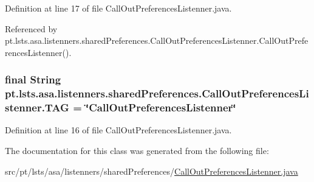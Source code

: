 Definition at line 17 of file Call\+Out\+Preferences\+Listenner.\+java.



Referenced by pt.\+lsts.\+asa.\+listenners.\+shared\+Preferences.\+Call\+Out\+Preferences\+Listenner.\+Call\+Out\+Preferences\+Listenner().

\hypertarget{classpt_1_1lsts_1_1asa_1_1listenners_1_1sharedPreferences_1_1CallOutPreferencesListenner_af3b9e5a9f28cdf18fdec5b181e0c6dc0}{}
\subsubsection[{T\+A\+G}]{\setlength{\rightskip}{0pt plus 5cm}final String pt.\+lsts.\+asa.\+listenners.\+shared\+Preferences.\+Call\+Out\+Preferences\+Listenner.\+T\+A\+G = \char`\"{}Call\+Out\+Preferences\+Listenner\char`\"{}\hspace{0.3cm}{\ttfamily [private]}}\label{classpt_1_1lsts_1_1asa_1_1listenners_1_1sharedPreferences_1_1CallOutPreferencesListenner_af3b9e5a9f28cdf18fdec5b181e0c6dc0}


Definition at line 16 of file Call\+Out\+Preferences\+Listenner.\+java.



The documentation for this class was generated from the following file\+:\begin{DoxyCompactItemize}
\item 
src/pt/lsts/asa/listenners/shared\+Preferences/\hyperlink{CallOutPreferencesListenner_8java}{Call\+Out\+Preferences\+Listenner.\+java}\end{DoxyCompactItemize}
